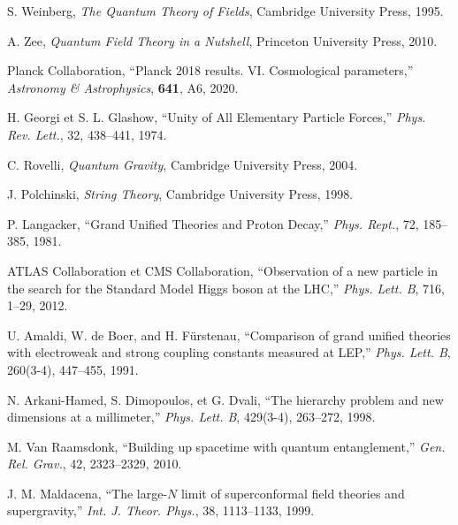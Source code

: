 \documentclass[12pt]{article}
\begin{document}
\begin{thebibliography}{9}

S. Weinberg, 
\textit{The Quantum Theory of Fields}, 
Cambridge University Press, 1995.

A. Zee, 
\textit{Quantum Field Theory in a Nutshell}, 
Princeton University Press, 2010.

Planck Collaboration, 
``Planck 2018 results. VI. Cosmological parameters,'' 
\textit{Astronomy \& Astrophysics}, \textbf{641}, A6, 2020.

H. Georgi et S. L. Glashow, 
``Unity of All Elementary Particle Forces,'' 
\textit{Phys. Rev. Lett.}, 32, 438--441, 1974.

C. Rovelli, 
\textit{Quantum Gravity}, 
Cambridge University Press, 2004.

J. Polchinski, 
\textit{String Theory}, 
Cambridge University Press, 1998.

P. Langacker, 
``Grand Unified Theories and Proton Decay,'' 
\textit{Phys. Rept.}, 72, 185--385, 1981.

ATLAS Collaboration et CMS Collaboration, 
``Observation of a new particle in the search for the Standard Model Higgs boson at the LHC,'' 
\textit{Phys. Lett. B}, 716, 1--29, 2012.

U. Amaldi, W. de Boer, and H. Fürstenau, 
``Comparison of grand unified theories with electroweak and strong coupling constants measured at LEP,'' 
\textit{Phys. Lett. B}, 260(3-4), 447--455, 1991.

N. Arkani-Hamed, S. Dimopoulos, et G. Dvali, 
``The hierarchy problem and new dimensions at a millimeter,'' 
\textit{Phys. Lett. B}, 429(3-4), 263--272, 1998.

M. Van Raamsdonk, 
``Building up spacetime with quantum entanglement,'' 
\textit{Gen. Rel. Grav.}, 42, 2323--2329, 2010.

J. M. Maldacena, 
``The large-$N$ limit of superconformal field theories and supergravity,'' 
\textit{Int. J. Theor. Phys.}, 38, 1113--1133, 1999.

\end{thebibliography}
\end{document}
